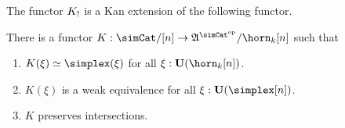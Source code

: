 
The functor $K_!$ is a Kan extension of the following functor.

\begin{lemma} There is a functor $K\of \simCat/[n]\to\ambient\s/\horn_k[n]$ such that 
\begin{enumerate}
\item $K(\xi)\simeq\simplex(\xi)$ for all $\xi\of\base(\horn_k[n])$.
\item $K(\xi)$ is a weak equivalence for all $\xi\of\base(\simplex[n])$.
\item $K$ preserves intersections.
\end{enumerate} \label{the functor K}
\end{lemma}

